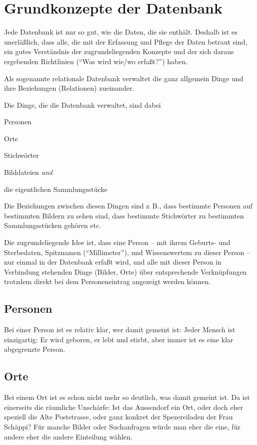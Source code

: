 \documentclass[12pt]{scrreprt}
\begin{document}
\chapter{Grundkonzepte der Datenbank}

Jede Datenbank ist nur so gut, wie die Daten, die sie enthält.
Deshalb ist es unerläßlich, dass alle, die mit der Erfassung und
Pflege der Daten betraut sind, ein gutes Verständnis der
zugrundeliegenden Konzepte und der sich daraus ergebenden Richtlinien
(``Was wird wie/wo erfaßt?'')  haben.

Als sogenannte relationale Datenbank verwaltet die \DB{} ganz allgemein Dinge und
ihre Beziehungen (Relationen) zueinander.

Die Dinge, die die Datenbank verwaltet, sind dabei
\begin{citemize}
\item Personen
\item Orte
\item Stichwörter
\item Bilddateien \textit{und}
\item die eigentlichen Sammlungsstücke
\end{citemize}

Die Beziehungen zwischen diesen Dingen sind z.\,B., dass bestimmte
Personen auf bestimmten Bildern zu sehen sind, dass bestimmte Stichwörter
zu bestimmten Sammlungsstücken gehören etc.

Die zugrundeliegende Idee ist, dass eine Person -- mit ihrem Geburts- und Sterbedaten,
Spitznamen (``Millimeter''), und Wissenswertem zu dieser Person -- nur
einmal in der Datenbank erfaßt wird, und alle mit dieser Person in Verbindung
stehenden Dinge (Bilder, Orte) über entsprechende Verknüpfungen trotzdem direkt
bei dem Personeneintrag angezeigt werden können.

\section{Personen} Bei einer Person ist es relativ klar, wer damit gemeint ist:
Jeder Mensch ist einzigartig: Er wird geboren, er lebt und stirbt, aber immer ist
es eine klar abgegrenzte Person.

\section{Orte} Bei einem Ort ist es schon nicht mehr so deutlich, was damit gemeint ist.
Da ist einerseits die räumliche Unschärfe: Ist das Aussendorf ein Ort, oder doch
eher speziell die Alte Poststrasse, oder ganz konkret der Spezereiladen der Frau Schäppi?
Für manche Bilder oder Suchanfragen würde man eher die eine, für andere eher die andere
Einteilung wählen. 
\end{document}

